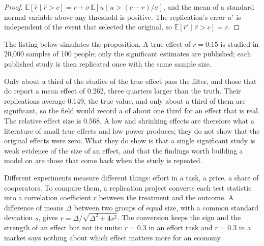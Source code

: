 \begin{proof}
$\mathbb{E}[\hat r \mid \hat r > c] = r + \sigma\,\mathbb{E}[u \mid u > (c - r)/\sigma]$, and the mean of
a standard normal variable above any threshold is positive. The replication's error $u'$ is independent
of the event that selected the original, so $\mathbb{E}[\hat r' \mid \hat r > c] = r$.
\end{proof}

The listing below simulates the proposition. A true effect of $r = 0.15$ is studied in 20,000 samples of
100 people; only the significant estimates are published; each published study is then replicated once
with the same sample size.

\label{lst:b2:behavioural-evidence:curse}

\label{out:b2:behavioural-evidence:curse}

Only about a third of the studies of the true effect pass the filter, and those that do report a mean
effect of 0.262, three quarters larger than the truth. Their replications average 0.149, the true value,
and only about a third of them are significant, so the field would record a  of about
one third for an effect that is real. The relative effect size is 0.568. A low  and
shrinking effects are therefore what a literature of small true effects and low power produces; they do
not show that the original effects were zero. What they do show is that a single significant study is
weak evidence of the size of an effect, and that the findings worth building a model on are those that
come back when the study is repeated.

\begin{measure}
Different experiments measure different things: effort in a task, a price, a share of cooperators. To
compare them, a replication project converts each test statistic into a correlation coefficient $r$
between the treatment and the outcome. A difference of means $\Delta$ between two groups of equal size,
with a common standard deviation $s$, gives $r = \Delta/\sqrt{\Delta^2 + 4s^2}$. The conversion keeps
the sign and the strength of an effect but not its units: $r = 0.3$ in an effort task and $r = 0.3$ in
a market says nothing about which effect matters more for an economy.
\end{measure}

